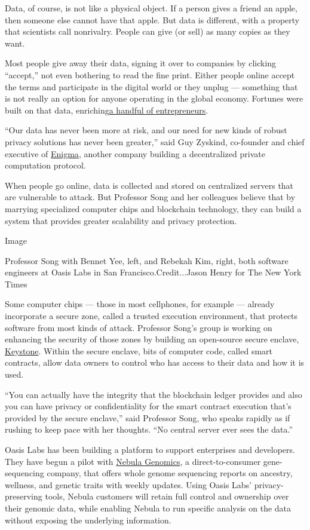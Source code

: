 Data, of course, is not like a physical object. If a person gives a
friend an apple, then someone else cannot have that apple. But data is
different, with a property that scientists call nonrivalry. People can
give (or sell) as many copies as they want.

Most people give away their data, signing it over to companies by
clicking ``accept,'' not even bothering to read the fine print. Either
people online accept the terms and participate in the digital world or
they unplug --- something that is not really an option for anyone
operating in the global economy. Fortunes were built on that data,
enriching\href{https://www.entrepreneur.com/article/319952}{a handful of
entrepreneurs}.

``Our data has never been more at risk, and our need for new kinds of
robust privacy solutions has never been greater,'' said Guy Zyskind,
co-founder and chief executive of \href{https://enigma.co/}{Enigma},
another company building a decentralized private computation protocol.

When people go online, data is collected and stored on centralized
servers that are vulnerable to attack. But Professor Song and her
colleagues believe that by marrying specialized computer chips and
blockchain technology, they can build a system that provides greater
scalability and privacy protection.

Image

Professor Song with Bennet Yee, left, and Rebekah Kim, right, both
software engineers at Oasis Labs in San Francisco.Credit...Jason Henry
for The New York Times

Some computer chips --- those in most cellphones, for example ---
already incorporate a secure zone, called a trusted execution
environment, that protects software from most kinds of attack. Professor
Song's group is working on enhancing the security of those zones by
building an open-source secure enclave,
\href{https://keystone-enclave.org/}{Keystone}. Within the secure
enclave, bits of computer code, called smart contracts, allow data
owners to control who has access to their data and how it is used.

``You can actually have the integrity that the blockchain ledger
provides and also you can have privacy or confidentiality for the smart
contract execution that's provided by the secure enclave,'' said
Professor Song, who speaks rapidly as if rushing to keep pace with her
thoughts. ``No central server ever sees the data.''

Oasis Labs has been building a platform to support enterprises and
developers. They have begun a pilot with
\href{https://nebula.org/}{Nebula Genomics}, a direct-to-consumer
gene-sequencing company, that offers whole genome sequencing reports on
ancestry, wellness, and genetic traits with weekly updates. Using Oasis
Labs' privacy-preserving tools, Nebula customers will retain full
control and ownership over their genomic data, while enabling Nebula to
run specific analysis on the data without exposing the underlying
information.

